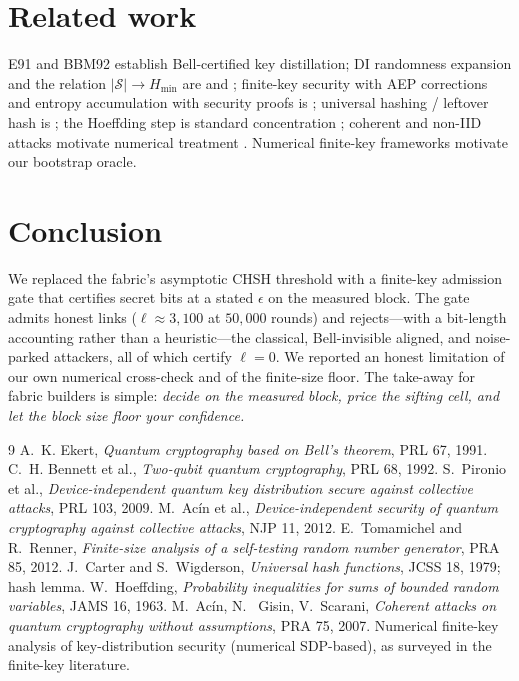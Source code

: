 \documentclass[11pt,a4paper]{article}
\newcommand{\CHSH}{\mathcal{S}}
\newcommand{\eps}{\epsilon}
\newcommand{\Hmin}{H_{\min}}
\newcommand{\bits}{\ell}
\theoremstyle{plain}
\theoremstyle{definition}
\begin{document}
\section{Related work}
E91 \citep{ekert1991} and BBM92 \citep{bbm92} establish Bell-certified key
distillation; DI randomness expansion and the relation $|\CHSH|\to\Hmin$ are
\citet{pironio2009device} and \citet{acin2012device}; finite-key security with
AEP corrections and entropy accumulation with security proofs is
\citet{tomamichel2012finite,acin2012device}; universal hashing / leftover hash
is \citet{leftoverhash}; the Hoeffding step is standard concentration
\citep{hoeffding1963}; coherent and non-IID attacks motivate numerical
treatment \citep{acín2007coherent}. Numerical finite-key frameworks
\citep{numericalfinitekey} motivate our bootstrap oracle.

\section{Conclusion}
We replaced the fabric's asymptotic CHSH threshold with a finite-key admission
gate that certifies secret bits at a stated $\eps$ on the measured block. The
gate admits honest links ($\bits\approx 3{,}100$ at $50{,}000$ rounds) and
rejects---with a bit-length accounting rather than a heuristic---the classical,
Bell-invisible aligned, and noise-parked attackers, all of which certify
$\bits = 0$. We reported an honest limitation of our own numerical cross-check
and of the finite-size floor. The take-away for fabric builders is simple:
\emph{decide on the measured block, price the sifting cell, and let the block
size floor your confidence.}

\begin{thebibliography}{9}
 A.~K. Ekert, \emph{Quantum cryptography based on Bell's
  theorem}, PRL 67, 1991.
 C.~H. Bennett et al., \emph{Two-qubit quantum cryptography},
  PRL 68, 1992.
 S.~Pironio et al., \emph{Device-independent quantum
  key distribution secure against collective attacks}, PRL 103, 2009.
 M.~Ac\'in et al., \emph{Device-independent security of
  quantum cryptography against collective attacks}, NJP 11, 2012.
 E.~Tomamichel and R.~Renner, \emph{Finite-size
  analysis of a self-testing random number generator}, PRA 85, 2012.
 J.~Carter and S.~Wigderson, \emph{Universal hash
  functions}, JCSS 18, 1979; \Sleftover hash lemma.
 W.~Hoeffding, \emph{Probability inequalities for sums
  of bounded random variables}, JAMS 16, 1963.
 M.~Ac\'in, N.~ Gisin, V.~Scarani, \emph{Coherent
  attacks on quantum cryptography without assumptions}, PRA 75, 2007.
 Numerical finite-key analysis of key-distribution
  security (numerical SDP-based), as surveyed in the finite-key literature.
\end{thebibliography}
\end{document}
